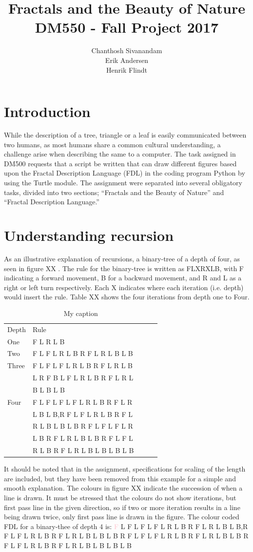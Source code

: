 \documentclass[titlepage]{article}
\author{Chanthosh Sivanandam \\ Erik Andersen \\ Henrik Flindt }
\title{Fractals and the Beauty of Nature \\ DM550 - Fall Project 2017}
\newcommand{\pink}{\textcolor{pink}}
\begin{document}
\maketitle
\section{Introduction}
While the description of a tree, triangle or a leaf is easily communicated between two humans, as most humans share a common cultural understanding, a challenge arise when describing the same to a computer. The task assigned in DM500 requests that a script be written that can draw different figures based upon the Fractal Description Language (FDL) in the coding program Python by using the Turtle module. The assignment were separated into several obligatory tasks, divided into two sections; “Fractals and the Beauty of Nature” and “Fractal Description Language.”

\section{Understanding recursion}
As an illustrative explanation of recursions, a binary-tree of a depth of four, as seen in figure XX . The rule for the binary-tree is written as FLXRXLB, with F indicating a forward movement, B for a backward movement, and R and L as a right or left turn respectively. Each X indicates where each iteration (i.e. depth) would insert the rule. Table XX  shows the four iterations from depth one to Four. 
\begin{table}[H]
\centering
\caption{My caption}
\label{my-label}
\begin{tabular}{lllll}
  Depth & Rule\\
  One   & F L R L B \\
  Two   & F L F L R L B R F L R L B L B\\
  Three &F L F L F L R L B R F L R L B \\
        & L R F B L F L R L B R F L R L  \\
  &B L B L B\\
  Four  & F L F L F L F L R L B R F L R\\
   & L B L B,R F L F L R L B R F L\\
   & R L B L B L B R F L F L F L R\\
   & L B R F L R L B L B R F L F L\\
   & R L B R F L R L B L B L B L B\\
  \end{tabular}
\end{table}
It should be noted that in the assignment, specifications for scaling of the length are included, but they have been removed from this example for a simple and smooth explanation. The colours in figure XX indicate the succession of when a line is drawn. It must be stressed that the colours do not show iterations, but first pass line in the given direction, so if two or more iteration results in a line being drawn twice, only first pass line is drawn in the figure. 
The colour coded FDL for a binary-thee of depth 4 is:
\pink{F} L F L F L F L R L B R F L R L B L B,R F L F L R L B R F L R L B L B L B R F L F L F L R L B R F L R L B L B R F L F L R L B R F L R L B L B L B L B
\end{document}
